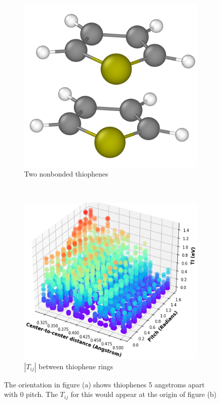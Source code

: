 \begin{figure}[]
\centering
\begin{subfigure}{.4\textwidth}
    \centering
    \includegraphics[width=\textwidth]{figures/thiophene.png}
    \caption{Two nonbonded thiophenes}
\end{subfigure}%
\\[2.0ex]
\begin{subfigure}{.8\textwidth}
    \centering
    \includegraphics[width=\textwidth]{figures/transfer_integral_plot.png}
    \caption{$|T_{ij}|$ between thiophene rings}
\end{subfigure}
    \caption{The orientation in figure (a) shows thiophenes 5 angstroms apart with 0 pitch. The $T_{ij}$ for
    this would appear at the origin of figure (b)}
\label{TIplots}
\end{figure}

